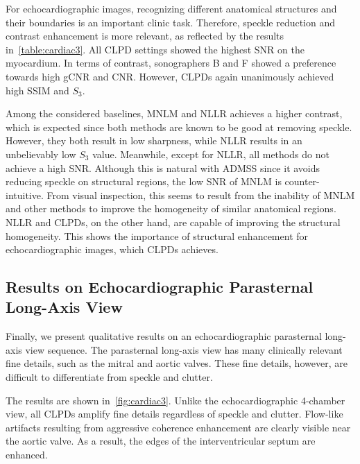For echocardiographic images, recognizing different anatomical structures and their boundaries is an important clinic task.
Therefore, speckle reduction and contrast enhancement is more relevant, as reflected by the results in~\cref{table:cardiac3}.
All CLPD settings showed the highest SNR on the myocardium.
In terms of contrast, sonographers B and F showed a preference towards high gCNR and CNR.
However, CLPDs again unanimously achieved high SSIM and \(S_3\).

Among the considered baselines, MNLM and NLLR achieves a higher contrast, which is expected since both methods are known to be good at removing speckle.
However, they both result in low sharpness, while NLLR results in an unbelievably low \(S_3\) value.
Meanwhile, except for NLLR, all methods do not achieve a high SNR.
Although this is natural with ADMSS since it avoids reducing speckle on structural regions, the low SNR of MNLM is counter-intuitive.
From visual inspection, this seems to result from the inability of MNLM and other methods to improve the homogeneity of similar anatomical regions.
NLLR and CLPDs, on the other hand, are capable of improving the structural homogeneity.
This shows the importance of structural enhancement for echocardiographic images, which CLPDs achieves.

\subsection{Results on Echocardiographic Parasternal Long-Axis View}
Finally, we present qualitative results on an echocardiographic parasternal long-axis view sequence.
The parasternal long-axis view has many clinically relevant fine details, such as the mitral and aortic valves.
These fine details, however, are difficult to differentiate from speckle and clutter.

The results are shown in~\cref{fig:cardiac3}.
Unlike the echocardiographic 4-chamber view, all CLPDs amplify fine details regardless of speckle and clutter.
Flow-like artifacts resulting from aggressive coherence enhancement are clearly visible near the aortic valve.
As a result, the edges of the interventricular septum are enhanced.

